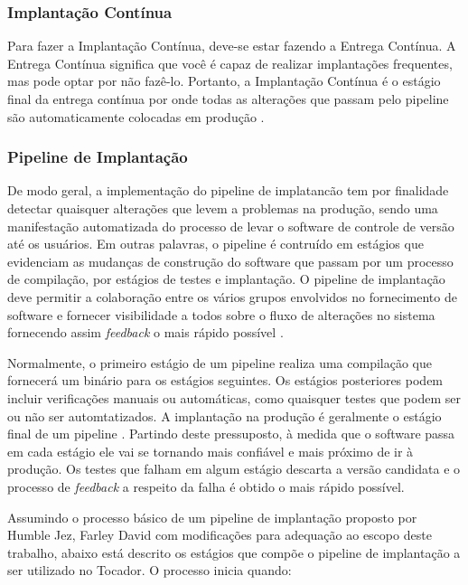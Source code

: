 \subsubsection{Implantação Contínua}

Para fazer a Implantação Contínua, deve-se estar fazendo a Entrega Contínua. A Entrega Contínua significa que você é capaz de realizar implantações frequentes, mas pode optar por não fazê-lo. Portanto, a Implantação Contínua é o estágio final da entrega contínua por onde todas as alterações que passam pelo pipeline são automaticamente colocadas em produção \cite{humble2010continuous}.

\subsubsection{Pipeline de Implantação}

De modo geral, a implementação do pipeline de implatancão tem por finalidade detectar quaisquer alterações que levem a problemas na produção, sendo uma manifestação automatizada do processo de levar o software de controle de versão até os usuários. Em outras palavras, o pipeline é contruído em estágios que evidenciam as mudanças de construção do software que passam por um processo de compilação, por estágios de testes e implantação. O pipeline de implantação deve permitir a colaboração entre os vários grupos envolvidos no fornecimento de software e fornecer visibilidade a todos sobre o fluxo de alterações no sistema fornecendo assim \textit{feedback} o mais rápido possível \cite{humble2010continuous}.

Normalmente, o primeiro estágio de um pipeline realiza uma compilação que fornecerá um binário para os estágios seguintes. Os estágios posteriores podem incluir verificações manuais ou automáticas, como quaisquer testes que podem ser ou não ser automtatizados. A implantação na produção é geralmente o estágio final de um pipeline \cite{humble2010continuous}. Partindo deste pressuposto, à medida que o software passa em cada estágio ele vai se tornando mais confiável e mais próximo de ir à produção. Os testes que falham em algum estágio descarta a versão candidata e o processo de \textit{feedback} a respeito da falha é obtido o mais rápido possível.

Assumindo o processo básico de um pipeline de implantação proposto por Humble Jez, Farley David \cite{humble2010continuous} com modificações para adequação ao escopo deste trabalho, abaixo está descrito os estágios que compõe o pipeline de implantação a ser utilizado no Tocador. O processo inicia quando:

